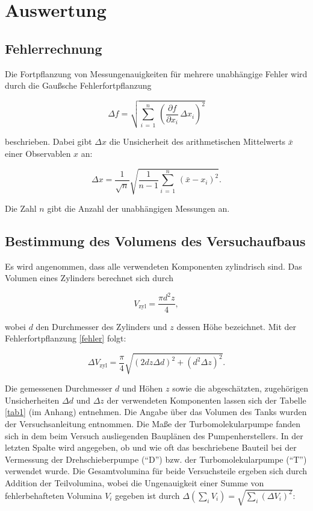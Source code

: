 \section{Auswertung}

\subsection{Fehlerrechnung}

Die Fortpflanzung von Messungenauigkeiten für mehrere unabhängige Fehler wird durch die Gaußsche Fehlerfortpflanzung

\begin{equation}
\Delta f = \sqrt{\sum_{i \, = \, 1}^{n} \, \left(\frac{\partial f}{\partial x_i} \, \Delta x_i\right)^2}
\label{fehler}
\end{equation}

beschrieben. Dabei gibt $\Delta x$ die Unsicherheit des arithmetischen Mittelwerts $\bar{x}$ einer Observablen $x$ an:

\begin{equation}
\Delta x = \frac{1}{\sqrt{n}} \sqrt{\frac{1}{n-1} \sum_{i \, = \, 1}^{n} \, \left(\bar{x}- x_i\right)^2}.
\end{equation}

Die Zahl $n$ gibt die Anzahl der unabhängigen Messungen an.


\subsection{Bestimmung des Volumens des Versuchaufbaus}

Es wird angenommen, dass alle verwendeten Komponenten zylindrisch sind. Das Volumen eines Zylinders berechnet sich durch

\begin{equation}
V_\text{zyl} = \frac{\pi d^2 z}{4},
\end{equation}

wobei $d$ den Durchmesser des Zylinders und $z$ dessen Höhe bezeichnet. Mit der Fehlerfortpflanzung \eqref{fehler} folgt:

\begin{equation}
\Delta V_\text{zyl} = \frac{\pi}{4} \sqrt{(2 d z \Delta d)^2 + (d^2 \Delta z)^2}.
\end{equation}

Die gemessenen Durchmesser $d$ und Höhen $z$ sowie die abgeschätzten, zugehörigen Unsicherheiten $\Delta d$ und $\Delta z$ der verwendeten Komponenten lassen sich der Tabelle \ref{tab1} (im Anhang) entnehmen. Die Angabe über das Volumen des Tanks wurden der Versuchsanleitung \cite{V70} entnommen. Die Maße der Turbomolekularpumpe fanden sich in dem beim Versuch ausliegenden Bauplänen des Pumpenherstellers. In der letzten Spalte wird angegeben, ob und wie oft das beschriebene Bauteil bei der Vermessung der Drehschieberpumpe (\enquote{D}) bzw. der Turbomolekularpumpe (\enquote{T}) verwendet wurde. Die Gesamtvolumina für beide Versuchsteile ergeben sich durch Addition der Teilvolumina, wobei die Ungenauigkeit einer Summe von fehlerbehafteten Volumina $V_i$ gegeben ist durch $\Delta \left(\sum_i V_i\right) = \sqrt{\sum_i (\Delta V_i )^2}$:

